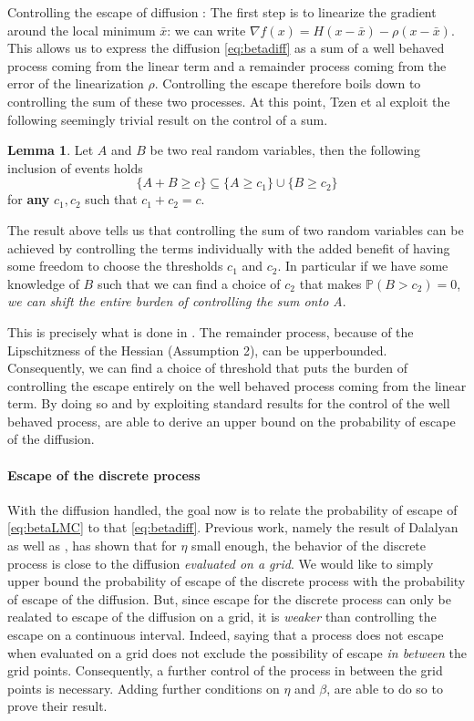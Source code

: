 \documentclass[11pt,twoside]{article}
\theoremstyle{definition}
\newtheorem{lemma}[theorem]{Lemma}
\newcommand{\Prb}{\mathbb{P}}
\begin{document}
\begin{paragraph}{Controlling the escape of diffusion :} The first step is to linearize the gradient around the local minimum $\bar{x}$: we can write $\nabla f(x) = H(x-\bar{x}) - \rho(x - \bar{x})$. This allows us to express the diffusion \eqref{eq:betadiff} as a sum of a well behaved process coming from the linear term and a remainder process coming from the error of the linearization $\rho$. Controlling the escape therefore boils down to controlling the sum of these two processes. At this point, Tzen et al exploit the following seemingly trivial result on the control of a sum.
\begin{lemma}
Let $A$ and $B$ be two real random variables, then the following inclusion of events holds 
\[
\{A + B \geq c \} \subseteq  \{A \geq c_1\} \cup \{ B \geq c_2\}
\]
for \textbf{any} $c_1, c_2$ such that $c_1 + c_2 = c$. 
\end{lemma}

The result above tells us that controlling the sum of two random variables can be achieved by controlling the terms individually with the added benefit of having some freedom to choose the thresholds $c_1$ and $c_2$. In particular if we have some knowledge of $B$ such that we can find a choice of $c_2$ that makes $\Prb(B > c_2) = 0$, \textit{we can shift the entire burden of controlling the sum onto A}.

This is precisely what is done in \cite{tzen_local_2018}. The remainder process, because of the Lipschitzness of the Hessian (Assumption 2), can be upperbounded. Consequently, we can find a choice of threshold that puts the burden of controlling the escape entirely on the well behaved process coming from the linear term. By doing so and by exploiting standard results for the control of the well behaved process, \cite{tzen_local_2018} are able to derive an upper bound on the probability of escape of the diffusion. 
\end{paragraph}

\paragraph{Escape of the discrete process} With the diffusion handled, the goal now is to relate the probability of escape of \eqref{eq:betaLMC} to that \eqref{eq:betadiff}. Previous work, namely the result of Dalalyan \cite{dalalyan_theoretical_2016} as well as \cite{raginsky_non-convex_2017}, has shown that for $\eta$ small enough, the behavior of the discrete process is close to the diffusion \textit{evaluated on a grid}. We would like to simply upper bound the probability of escape of the discrete process with the probability of escape of the diffusion. But, since escape for the discrete process can only be realated to escape of the diffusion on a grid, it is \emph{weaker} than controlling the escape on a continuous interval. Indeed, saying that a process does not escape when evaluated on a grid does not exclude the possibility of escape \emph{in between} the grid points. Consequently, a further control of the process in between the grid points is necessary. Adding further conditions on $\eta$ and $\beta$, \cite{tzen_local_2018} are able to do so to prove their result.
\end{document}
